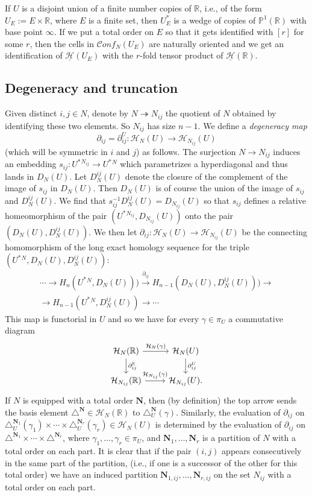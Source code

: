 \documentclass[12pt,letterpaper]{amsart}
\numberwithin{equation}{section}
\def\Nbold{{\mathbf N}}
\def\PP{{\mathbb P}}
\def\RR{{\mathbb R}}
\def\g{\gamma}
\def\tri{\triangle}
\newcommand{\p}{\partial}
\def\Hcal{{\mathcal H}}
\def\uHcal{{\underline\Hcal}}
\newcommand\conf{\mathscr{C}\!\mathit{onf}\!}
\theoremstyle{remark}
\begin{document}
If  $U$ is a disjoint union of a finite number copies of $\RR$, i.e., of the form $U_E:=E\times \RR$, where $E$ is a finite set, then $U_E^*$ is  a wedge of copies of $\PP^1(\RR)$ with base point $\infty$. If we put a total order on $E$ 
so that it gets identified with $[r]$ for some $r$, then the cells in $\conf_N(U_E)$ are naturally oriented and we get an identification of  
$\uHcal(U_E)$ with the $r$-fold tensor product of
$\uHcal(\RR)$.

\subsection{Degeneracy and truncation}\label{subsection:truncation}
Given distinct $i,j\in N$, denote by $N\twoheadrightarrow N_{ij}$ the quotient of $N$ obtained by identifying these two elements.  
So $N_{ij}$ has size $n-1$. We define a \emph{degeneracy  map} 
\[
\p_{ij}=\p^U_{ij}: \Hcal_N(U)\to \Hcal_{N_{ij}}(U)
\]
(which  will be  symmetric in $i$ and $j$) as follows. 
The surjection $N\to N_{ij}$ induces an embedding  $s_{ij}: U^*{}^{N_{ij}}\to U^*{}^N$ which  parametrizes a hyperdiagonal and thus lands in  
$D_N(U)$.  Let $D^{ij}_N(U)$ denote   the closure of the complement of the image of $s_{ij}$ in $D_N(U)$. 
Then  $D_N(U)$ is of course the union of the image of $s_{ij}$ and $D^{ij}_{N}(U)$. We find that $s_{ij}^{-1}D^{ij}_{N}(U)=D_{N_{ij}}(U)$ so that   $s_{ij}$ defines  a relative homeomorphism  of the pair $(U^*{}^{N_{ij}},D_{N_{ij}}(U))$ onto the pair $(D_N(U), D^{ij}_N(U))$. We then let
$\p_{ij}: \Hcal_{N}(U)\to \Hcal_{N_{ij}}(U)$ be the connecting homomorphism  of the  long exact homology sequence for the triple 
 $(U^*{}^N,D_N(U), D^{ij}_N(U)) $:
\begin{multline}\label{eqn:deg}
 \cdots \to H_{n}(U^*{}^N, D_N(U)))\xrightarrow{\p_{ij}}  H_{n-1}(D_N(U),  D^{ij}_N(U)))\to\\
 \to  H_{n-1}(U^*{}^N,  D^{ij}_N(U))\to\cdots
\end{multline}
This  map is functorial in $U$ and so we have for every $\g\in \pi_U$ a commutative diagram
\[
\begin{tikzcd}
\Hcal_N(\RR)\arrow[r, "\Hcal_N(\g)"]\arrow[d, "\p^\RR_{ij}"] & \Hcal_N(U)\arrow[d, "\p^U_{ij}"]\\
\Hcal_{N_{ij}}(\RR)\arrow[r, "\Hcal_{N_{ij}}(\g)"] & \Hcal_{N_{ij}}(U).
\end{tikzcd}
\]
If $N$ is equipped with a total order $\Nbold$, then (by definition) the top arrow sends the basis element $\tri^\Nbold\in \Hcal_N(\RR)$ to $\tri^\Nbold_U(\g)$. 
Similarly, the evaluation of $\partial_{ij}$ on $\tri_U^{\Nbold_1}(\g_1)\times \cdots\times \tri_U^{\Nbold_r}(\g_r)\in \Hcal_N(U)$ is determined by the evaluation of $\partial_{ij}$ on $\tri^{\Nbold_1}\times \cdots\times \tri^{\Nbold_r}$, where $\g_1, \ldots, \g_r\in \pi_U$, and $\Nbold_1,\ldots, \Nbold_r$ is a partition of $N$ with a total order on each part. It is clear that if the pair  $(i,j)$  appears consecutively in the same part of the partition, (i.e.,  if one is a successor of the other for this total order) we have an induced partition $\Nbold_{1,ij}, \ldots, \Nbold_{r, ij}$ on the set $N_{ij}$ with a total order on each part.
\end{document}
